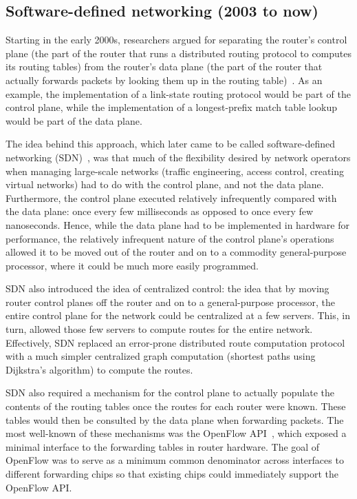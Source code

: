 
\subsection{Software-defined networking (2003 to now)}
Starting in the early 2000s, researchers argued for separating the router's
control plane (\ie the part of the router that runs a distributed routing
protocol to computes its routing tables) from the router's data plane (\ie the
part of the router that actually forwards packets by looking them up in the
routing table)~\cite{rcp, forces, fourd, ethane, sane}. As an example, the
implementation of a link-state routing protocol would be part of the control
plane, while the implementation of a longest-prefix match table lookup would be
part of the data plane.

The idea behind this approach, which later came to be called software-defined
networking (SDN)~\cite{sdn_coining}, was that much of the flexibility desired
by network operators when managing large-scale networks (\eg traffic
engineering, access control, creating virtual networks) had to do with the
control plane, and not the data plane.  Furthermore, the control plane executed
relatively infrequently compared with the data plane: once every few
milliseconds as opposed to once every few nanoseconds. Hence, while the data
plane had to be implemented in hardware for performance, the relatively
infrequent nature of the control plane's operations allowed it to be moved out
of the router and on to a commodity general-purpose processor, where it could
be much more easily programmed.

SDN also introduced the idea of centralized control: the idea that by moving
router control planes off the router and on to a general-purpose processor, the
entire control plane for the network could be centralized at a few servers.
This, in turn, allowed those few servers to compute routes for the entire
network. Effectively, SDN replaced an error-prone distributed route computation
protocol with a much simpler centralized graph computation (\eg shortest paths
using Dijkstra's algorithm) to compute the routes.

SDN also required a mechanism for the control plane to actually populate the
contents of the routing tables once the routes for each router were known.
These tables would then be consulted by the data plane when forwarding packets.
The most well-known of these mechanisms was the OpenFlow API~\cite{openflow},
which exposed a minimal interface to the forwarding tables in router hardware.
The goal of OpenFlow was to serve as a minimum common denominator across
interfaces to different forwarding chips so that existing chips could
immediately support the OpenFlow API.

